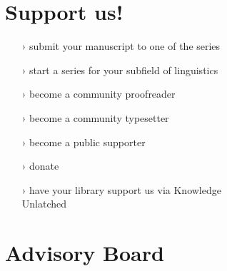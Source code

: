 \documentclass[
notumble,
nofoldmark,
]{leaflet}
\begin{document}

\vspace*{-1em}
% 
\section{\sffamily\Large\bfseries Support us!}
  
\color{LIGHTGRAY}
    \begin{itemize}
\setlength{\itemsep}{-3pt} 
      \item[›] submit your manuscript to one of the series
      \item[›] start a series for your subfield of linguistics
      \item[›] become a community proofreader 
      \item[›] become a community typesetter
      \item[›] become a public supporter
      \item[›] donate
      \item[›] have your library support us via Knowledge\\ Unlatched
    \end{itemize} 


  
 

\newpage 
\color{LIGHTGRAY}
\section{\sffamily\Large\bfseries Advisory Board}
\end{document}
